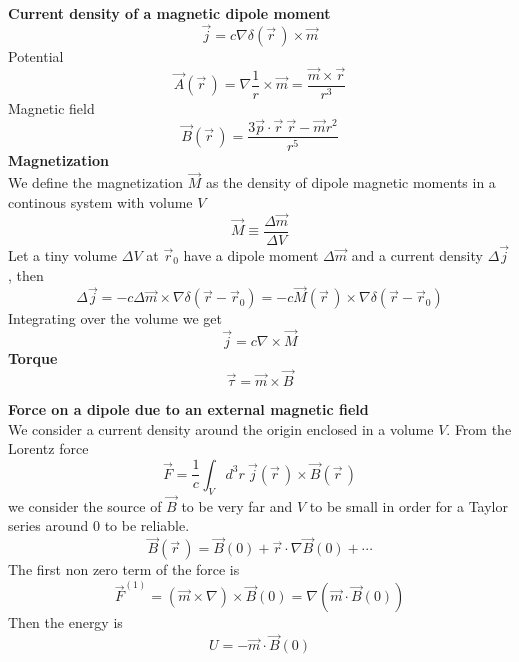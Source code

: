 \documentclass[12pt,a4paper]{article}
\newcommand{\integral}[3]{\int_{#1}^{#2} d #3 \ } %
\begin{document}
\textbf{Current density of a magnetic dipole moment}
\begin{equation}
	\vec{j} = c \nabla \delta (\vec{r}\, ) \times \vec{m}
\end{equation}
Potential
\begin{equation}
	\vec{A}(\vec{r}\,) = \nabla\frac{1}{r} \times \vec{m}  = \frac{\vec{m}\times \vec{r}}{r^3}
\end{equation}
Magnetic field
\begin{equation}
	\vec{B}(\vec{r}\,) =  \frac{3\vec{p}\cdot \vec{r} \ \vec{r}-\vec{m}r^2}{r^5}
\end{equation}
\textbf{Magnetization}\\
We define the magnetization $\vec{M}$ as the density of dipole magnetic moments in a continous system with volume $V$
\begin{equation}
	\vec{M} \equiv \frac{\Delta \vec{m}}{\Delta V} 
\end{equation}
Let a tiny volume $\Delta V$ at $\vec{r}_0$ have a dipole moment $\Delta \vec{m}$ and a current density $\Delta \vec{j}$, then
\begin{equation}
	\Delta \vec{j} = -c\Delta \vec{m}  \times \nabla \delta (\vec{r} -\vec{r}_0) = - c\vec{M}(\vec{r}\,) \times \nabla \delta (\vec{r} -\vec{r}_0) 
\end{equation}
Integrating over the volume we get
\begin{equation}
 \vec{j} = c\nabla\times \vec{M}
\end{equation}
\textbf{Torque}
\begin{equation}
	\vec{\tau} = \vec{m} \times \vec{B}
\end{equation}


\textbf{Force on a dipole due to an external magnetic field} \\
We consider a current density around the origin enclosed in a volume $V$. From the Lorentz force
\begin{equation}
	\vec{F} = \frac{1}{c} \integral{V}{}{^3r} \vec{j}(\vec{r}\,) \times \vec{B}(\vec{r}\,)
\end{equation}
we consider the source of $\vec{B}$ to be  very far and $V$ to be small in order for a Taylor series around 0 to be reliable. 
\begin{equation}
\vec{B}(\vec{r}\,) = \vec{B}(0) + \vec{r} \cdot \nabla \vec{B}(0) + \cdots
\end{equation}
The first non zero term of the force is 
\begin{equation}
	\vec{F}^{(1)} = (\vec{m} \times \nabla) \times \vec{B}(0) = \nabla(\vec{m} \cdot \vec{B}(0))
\end{equation}
Then the energy is
\begin{equation}
	U = - \vec{m} \cdot \vec{B}(0)
\end{equation}
\end{document}
